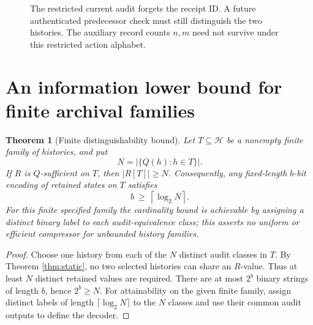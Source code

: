 \documentclass[11pt,letterpaper]{article}
\newtheorem{theorem}{Theorem}[section]
\theoremstyle{definition}
\newcommand{\Hh}{\mathcal H}
\begin{document}
\begin{figure}[htbp]\centering
{}
\caption{The restricted current audit forgets the receipt ID. A future authenticated predecessor check must still distinguish the two histories. The auxiliary record counts $n,m$ need not survive under this restricted action alphabet.}
\label{fig:worked}
\end{figure}

\section{An information lower bound for finite archival families}
\begin{theorem}[Finite distinguishability bound]\label{thm:bits}
Let $T\subseteq\Hh$ be a nonempty finite family of histories, and put
\[
N=\bigl|\{Q(h):h\in T\}\bigr|.
\]
If $R$ is $Q$-sufficient on $T$, then $\bigl|R[T]\bigr|\ge N$. Consequently, any fixed-length $b$-bit encoding of retained states on $T$ satisfies
\[
b\ \ge\ \left\lceil\log_2 N\right\rceil.
\]
For this \emph{finite specified family} the cardinality bound is achievable by assigning a distinct binary label to each audit-equivalence class; this asserts no uniform or efficient compressor for unbounded history families.
\end{theorem}
\begin{proof}
Choose one history from each of the $N$ distinct audit classes in $T$. By Theorem \ref{thm:static}, no two selected histories can share an $R$-value. Thus at least $N$ distinct retained values are required. There are at most $2^b$ binary strings of length $b$, hence $2^b\ge N$. For attainability on the given finite family, assign distinct labels of length $\lceil\log_2 N\rceil$ to the $N$ classes and use their common audit outputs to define the decoder.
\end{proof}
\end{document}
